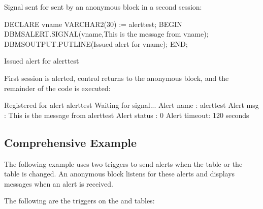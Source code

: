 \documentclass[letterpaper,10pt,english,openany,oneside]{sphinxmanual}
\begin{document}
Signal sent for  sent by an anonymous block in a second session:

%
\begin{sphinxVerbatim}[commandchars=\\\{\}]
DECLARE
    v\PYGZus{}name   VARCHAR2(30) := \PYGZsq{}alert\PYGZus{}test\PYGZsq{};
BEGIN
   DBMS\PYGZus{}ALERT.SIGNAL(v\PYGZus{}name,\PYGZsq{}This is the message from \PYGZsq{} \textbar{}\textbar{} v\PYGZus{}name);
   DBMS\PYGZus{}OUTPUT.PUT\PYGZus{}LINE(\PYGZsq{}Issued alert for \PYGZsq{} \textbar{}\textbar{} v\PYGZus{}name);
END;

Issued alert for alert\PYGZus{}test
\end{sphinxVerbatim}

First session is alerted, control returns to the anonymous block, and the remainder of the code is executed:

%
\begin{sphinxVerbatim}[commandchars=\\\{\}]
Registered for alert alert\PYGZus{}test
Waiting for signal...
Alert name   : alert\PYGZus{}test
Alert msg    : This is the message from alert\PYGZus{}test
Alert status : 0
Alert timeout: 120 seconds
\end{sphinxVerbatim}

\newpage

\ignorespaces 

\subsection{Comprehensive Example}
\label{\detokenize{dbms_alert:comprehensive-example}}\label{\detokenize{dbms_alert:index-7}}
The following example uses two triggers to send alerts when the 
table or the  table is changed. An anonymous block listens for these
alerts and displays messages when an alert is received.

The following are the triggers on the  and  tables:
\end{document}

